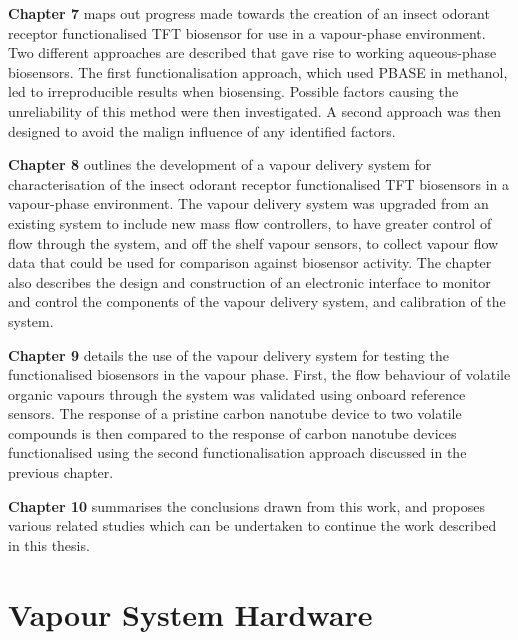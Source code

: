 \documentclass[
  a4paper,
]{scrbook}
\begin{document}
\textbf{Chapter 7} maps out progress made towards the creation of an
insect odorant receptor functionalised TFT biosensor for use in a
vapour-phase environment. Two different approaches are described that
gave rise to working aqueous-phase biosensors. The first
functionalisation approach, which used PBASE in methanol, led to
irreproducible results when biosensing. Possible factors causing the
unreliability of this method were then investigated. A second approach
was then designed to avoid the malign influence of any identified
factors.

\textbf{Chapter 8} outlines the development of a vapour delivery system
for characterisation of the insect odorant receptor functionalised TFT
biosensors in a vapour-phase environment. The vapour delivery system was
upgraded from an existing system to include new mass flow controllers,
to have greater control of flow through the system, and off the shelf
vapour sensors, to collect vapour flow data that could be used for
comparison against biosensor activity. The chapter also describes the
design and construction of an electronic interface to monitor and
control the components of the vapour delivery system, and calibration of
the system.

\textbf{Chapter 9} details the use of the vapour delivery system for
testing the functionalised biosensors in the vapour phase. First, the
flow behaviour of volatile organic vapours through the system was
validated using onboard reference sensors. The response of a pristine
carbon nanotube device to two volatile compounds is then compared to the
response of carbon nanotube devices functionalised using the second
functionalisation approach discussed in the previous chapter.

\textbf{Chapter 10} summarises the conclusions drawn from this work, and
proposes various related studies which can be undertaken to continue the
work described in this thesis.

\cleardoublepage
{}
{}
\appendix

\hypertarget{vapour-system-hardware}{%
\chapter{Vapour System Hardware}\label{vapour-system-hardware}}
\end{document}
